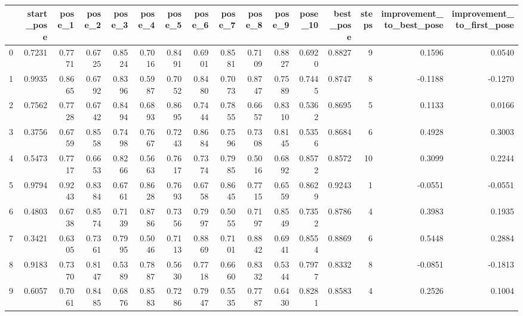 \begin{tabular}{lrrrrrrrrrrrrrrr}
\toprule
{} &  start\_pose &  pose\_1 &  pose\_2 &  pose\_3 &  pose\_4 &  pose\_5 &  pose\_6 &  pose\_7 &  pose\_8 &  pose\_9 &  pose\_10 &  best\_pose &  steps &  improvement\_to\_best\_pose &  improvement\_to\_first\_pose \\
\midrule
0 &      0.7231 &  0.7771 &  0.6725 &  0.8524 &  0.7016 &  0.8491 &  0.6901 &  0.8581 &  0.7109 &  0.8827 &   0.6920 &     0.8827 &      9 &                    0.1596 &                     0.0540 \\
1 &      0.9935 &  0.8665 &  0.6792 &  0.8396 &  0.5987 &  0.7052 &  0.8480 &  0.7073 &  0.8747 &  0.7589 &   0.7445 &     0.8747 &      8 &                   -0.1188 &                    -0.1270 \\
2 &      0.7562 &  0.7728 &  0.6742 &  0.8494 &  0.6893 &  0.8695 &  0.7444 &  0.7855 &  0.6657 &  0.8310 &   0.5362 &     0.8695 &      5 &                    0.1133 &                     0.0166 \\
3 &      0.3756 &  0.6759 &  0.8558 &  0.7498 &  0.7667 &  0.7243 &  0.8684 &  0.7596 &  0.7308 &  0.8145 &   0.5356 &     0.8684 &      6 &                    0.4928 &                     0.3003 \\
4 &      0.5473 &  0.7717 &  0.6653 &  0.8266 &  0.5663 &  0.7617 &  0.7374 &  0.7985 &  0.5016 &  0.6892 &   0.8572 &     0.8572 &     10 &                    0.3099 &                     0.2244 \\
5 &      0.9794 &  0.9243 &  0.8384 &  0.6761 &  0.8628 &  0.7693 &  0.6758 &  0.8645 &  0.7715 &  0.6559 &   0.8629 &     0.9243 &      1 &                   -0.0551 &                    -0.0551 \\
6 &      0.4803 &  0.6738 &  0.8574 &  0.7139 &  0.8786 &  0.7356 &  0.7997 &  0.5055 &  0.7197 &  0.8549 &   0.7352 &     0.8786 &      4 &                    0.3983 &                     0.1935 \\
7 &      0.3421 &  0.6305 &  0.7361 &  0.7995 &  0.5046 &  0.7113 &  0.8869 &  0.7101 &  0.8842 &  0.6941 &   0.8554 &     0.8869 &      6 &                    0.5448 &                     0.2884 \\
8 &      0.9183 &  0.7370 &  0.8147 &  0.5389 &  0.7887 &  0.5630 &  0.7718 &  0.6660 &  0.8332 &  0.5344 &   0.7977 &     0.8332 &      8 &                   -0.0851 &                    -0.1813 \\
9 &      0.6057 &  0.7061 &  0.8485 &  0.6876 &  0.8583 &  0.7286 &  0.7947 &  0.5535 &  0.7787 &  0.6430 &   0.8281 &     0.8583 &      4 &                    0.2526 &                     0.1004 \\
\bottomrule
\end{tabular}
